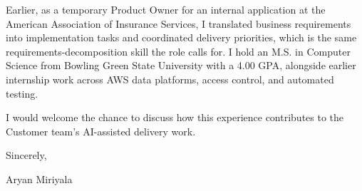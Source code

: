 \documentclass[letterpaper,11pt]{article}
\begin{document}
Earlier, as a temporary Product Owner for an internal application at the American Association of Insurance Services, I translated business requirements into implementation tasks and coordinated delivery priorities, which is the same requirements-decomposition skill the role calls for. I hold an M.S. in Computer Science from Bowling Green State University with a 4.00 GPA, alongside earlier internship work across AWS data platforms, access control, and automated testing.

I would welcome the chance to discuss how this experience contributes to the Customer team's AI-assisted delivery work.

Sincerely,

Aryan Miriyala
\end{document}
